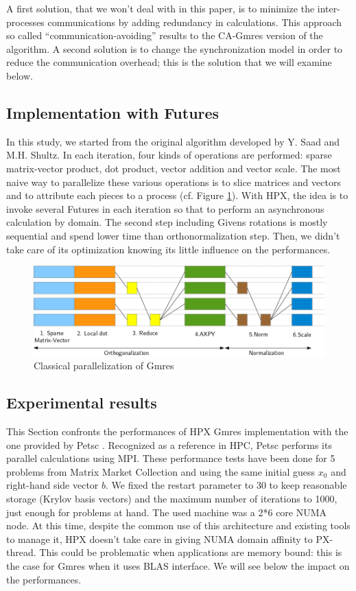 \documentclass[smallextended]{svjour3}
\begin{document}
A first solution, that we won't deal with in this paper, is to minimize the inter-processes communications by adding redundancy in calculations. This approach so called \enquote{communication-avoiding} \cite{CAGMRES} results to the CA-Gmres version of the algorithm. A second solution is to change the synchronization model in order to reduce the communication overhead; this is the solution that we will examine below.

\subsection{Implementation with Futures}
In this study, we started from the original algorithm \cite{GMRES} developed by Y. Saad and M.H. Shultz. In each iteration, four kinds of operations are performed: sparse matrix-vector product, dot product, vector addition and vector scale. The most naive way to parallelize these various operations is to slice matrices and vectors and to attribute each pieces to a process (cf. Figure \ref{pargmres}). With HPX, the idea is to invoke several Futures in each iteration so that to perform an asynchronous calculation by domain. The second step including Givens rotations is mostly sequential and spend lower time than orthonormalization step. Then, we didn't take care of its optimization knowing its little influence on the performances.

\begin{figure}[h]
\begin{center}
\includegraphics[scale=0.5]{Images/Im6.png}
\end{center}
\caption{Classical parallelization of Gmres}
\label{pargmres}
\end{figure}

\subsection{Experimental results}
This Section confronts the performances of HPX Gmres implementation with the one provided by Petsc \cite{Petsc}. Recognized as a reference in HPC, Petsc performs its parallel calculations using MPI. These performance tests have been done for 5 problems from Matrix Market Collection and using the same initial guess $x_{0}$ and right-hand side vector $b$. We fixed the restart parameter to 30 to keep reasonable storage (Krylov basis vectors) and the maximum number of iterations to 1000, just enough for problems at hand. The used machine was a 2*6 core NUMA node. At this time, despite the common use of this architecture and existing tools to manage it, HPX doesn't take care in giving NUMA domain affinity to PX-thread. This could be problematic when applications are memory bound: this is the case for Gmres when it uses BLAS interface. We will see below the impact on the performances.\smallskip  
\end{document}
